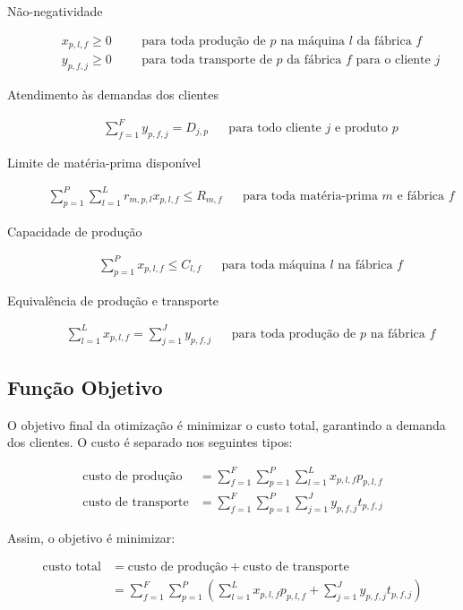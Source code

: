         \begin{description}
            \item[Não-negatividade] \begin{align*}
                x_{p,l,f} \geq 0
                && &\text{para toda produção de $p$ na máquina $l$ da fábrica $f$} \\
                y_{p,f,j} \geq 0
                && &\text{para toda transporte de $p$ da fábrica $f$ para o cliente $j$}
            \end{align*}
            \item[Atendimento às demandas dos clientes] \begin{align*}
                \sum_{f = 1}^F y_{p,f,j} = D_{j,p}
                && \text{para todo cliente $j$ e produto $p$}
            \end{align*}
            \item[Limite de matéria-prima disponível] \begin{align*}
                \sum_{p = 1}^P \sum_{l = 1}^L r_{m,p,l} x_{p,l,f} \leq R_{m,f}
                && \text{para toda matéria-prima $m$ e fábrica $f$}
            \end{align*}
            \item[Capacidade de produção] \begin{align*}
                \sum_{p = 1}^P x_{p,l,f} \leq C_{l,f}
                && \text{para toda máquina $l$ na fábrica $f$}
            \end{align*}
            \item[Equivalência de produção e transporte] \begin{align*}
                \sum_{l = 1}^L x_{p,l,f} = \sum_{j = 1}^J y_{p,f,j}
                && \text{para toda produção de $p$ na fábrica $f$}
            \end{align*}
        \end{description}

    \subsection{Função Objetivo}

        O objetivo final da otimização é minimizar o custo total, garantindo a demanda dos clientes. O custo é separado nos seguintes tipos:

        \begin{align*}
            \text{custo de produção} &= \sum_{f = 1}^F \sum_{p = 1}^P \sum_{l = 1}^L  x_{p,l,f} p_{p,l,f} \\
            \text{custo de transporte} &= \sum_{f = 1}^F \sum_{p = 1}^P \sum_{j = 1}^J y_{p,f,j} t_{p,f,j}
        \end{align*}

        Assim, o objetivo é minimizar:

        \begin{align*}
            \text{custo total} &= \text{custo de produção} + \text{custo de transporte} \\
            &= \sum_{f = 1}^F \sum_{p = 1}^P \left(\sum_{l = 1}^L  x_{p,l,f} p_{p,l,f} + \sum_{j = 1}^J y_{p,f,j} t_{p,f,j}\right)
        \end{align*}
